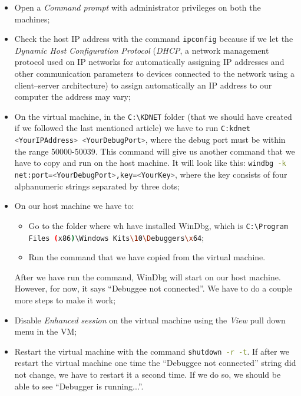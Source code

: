 \begin{itemize}
	\item 
		Open a \textit{Command prompt} with administrator privileges on both the machines;
	\item 
		Check the host IP address with the command \lstinline[style=commandline, language=bash]|ipconfig| because if we let the \textit{Dynamic Host Configuration Protocol} (\textit{DHCP}, a network management protocol used on IP networks for automatically assigning IP addresses and other communication parameters to devices connected to the network using a client–server architecture) to assign automatically an IP address to our computer the address may vary;
	\item 
		On the virtual machine, in the \lstinline[style=commandline, language=bash]|C:\KDNET| folder (that we should have created if we followed the last mentioned article) we have to run \lstinline[style=commandline, language=bash]|C:kdnet <YourIPAddress> <YourDebugPort>|, where the debug port must be within the range 50000-50039.
		This command will give us another command that we have to copy and run on the host machine.
		It will look like this: \lstinline[style=commandline, language=bash]|windbg -k net:port=<YourDebugPort>,key=<YourKey>|, where the key consists of four alphanumeric strings separated by three dots;
	\item 
		On our host machine we have to:
		\begin{itemize}
			\item 
				Go to the folder where wh have installed WinDbg, which is \lstinline[style=commandline, language=bash]|C:\Program Files (x86)\Windows Kits\10\Debuggers\x64|;
			\item 
				Run the command that we have copied from the virtual machine.
		\end{itemize}
		After we have run the command, WinDbg will start on our host machine.
		However, for now, it says ``Debuggee not connected''.
		We have to do a couple more steps to make it work;
	\item 
		Disable \textit{Enhanced session} on the virtual machine using the \textit{View} pull down menu in the VM;
	\item 
		Restart the virtual machine with the command \lstinline[style=commandline, language=bash]|shutdown -r -t|.	
		If after we restart the virtual machine one time the ``Debuggee not connected'' string did not change, we have to restart it a second time.
		If we do so, we should be able to see ``Debugger is running...''.
\end{itemize}


